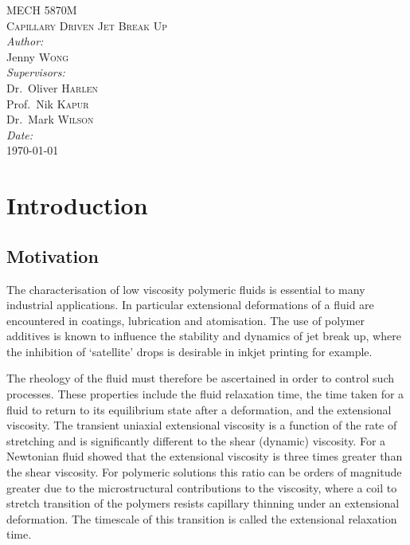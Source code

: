 \documentclass[11pt]{article}
\begin{document}
\begin{titlepage}
\begin{flushright}
\null \vfill
\vfill
\textsc{\LARGE MECH 5870M}\\[1.5cm]

\textsc{\Large Capillary Driven Jet Break Up}\\[0.7cm]

\noindent
\large
\emph{Author:}\\
Jenny \textsc{Wong} \\[1cm]
\large
\emph{Supervisors:} \\
Dr.~Oliver \textsc{Harlen} \\
Prof.~Nik \textsc{Kapur}
\\
Dr.~Mark \textsc{Wilson} \\[1cm]

\emph{Date:}\\
{\large \today}
\end{flushright}
\end{titlepage}

\cleardoublepage

\begin{spacing}{0.9}
\tableofcontents
\end{spacing}

\newpage

\section{Introduction}

\subsection{Motivation}
The characterisation of low viscosity polymeric fluids is essential to many industrial applications. In particular extensional deformations of a fluid are encountered in coatings, lubrication and atomisation. The use of polymer additives is known to influence the stability and dynamics of jet break up, where the inhibition of `satellite' drops is desirable in inkjet printing for example.

The rheology of the fluid must therefore be ascertained in order to control such processes. These properties include the fluid relaxation time, the time taken for a fluid to return to its equilibrium state after a deformation, and the extensional viscosity. The transient uniaxial extensional viscosity is a function of the rate of stretching and is significantly different to the shear (dynamic) viscosity. For a Newtonian fluid \cite{fred1906coefficient} showed that the extensional viscosity is three times greater than the shear viscosity. For polymeric solutions this ratio can be orders of magnitude greater due to the microstructural contributions to the viscosity, where a coil to stretch transition of the polymers resists capillary thinning under an extensional deformation. The timescale of this transition is called the extensional relaxation time.
\end{document}
